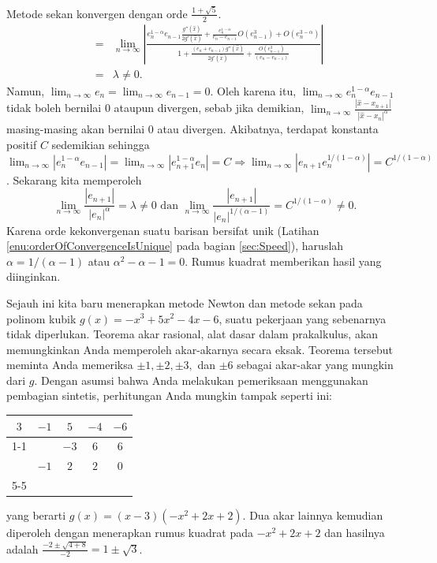 \begin{digression}{Metode sekan konvergen dengan orde $\frac{1+\sqrt{5}}{2}$.}
\begin{eqnarray*}
 & = & \lim_{n\to\infty}\left|\frac{e_{n}^{1-\alpha}e_{n-1}\frac{g''(\hat{x})}{2g'(\hat{x})}+\frac{e_{n}^{1-\alpha}}{e_{n}-e_{n-1}}O(e_{n-1}^{3})+O(e_{n}^{3-\alpha})}{1+\frac{(e_{n}+e_{n-1})g''(\hat{x})}{2g'(\hat{x})}+\frac{O(e_{n-1}^{3})}{(e_{n}-e_{n-1})}}\right|\\
 & = & \lambda\neq0.
\end{eqnarray*}
Namun, $\lim_{n\to\infty}e_{n}=\lim_{n\to\infty}e_{n-1}=0$. Oleh
karena itu, $\lim_{n\to\infty}e_{n}^{1-\alpha}e_{n-1}$ tidak boleh
bernilai 0 ataupun divergen, sebab jika demikian, $\lim_{n\to\infty}\frac{|\hat{x}-x_{n+1}|}{|\hat{x}-x_{n}|^{\alpha}}$
masing-masing akan bernilai 0 atau divergen. Akibatnya, terdapat konstanta
positif $C$ sedemikian sehingga $\lim_{n\to\infty}|e_{n}^{1-\alpha}e_{n-1}|=\lim_{n\to\infty}|e_{n+1}^{1-\alpha}e_{n}|=C\Rightarrow\lim_{n\to\infty}|e_{n+1}e_{n}^{1/(1-\alpha)}|=C^{1/(1-\alpha)}$.
Sekarang kita memperoleh 
\[
\lim_{n\to\infty}\frac{|e_{n+1}|}{|e_{n}|^{\alpha}}=\lambda\neq0\mbox{ dan }\lim_{n\to\infty}\frac{|e_{n+1}|}{|e_{n}|^{1/(\alpha-1)}}=C^{1/(1-\alpha)}\neq0.
\]
Karena orde kekonvergenan suatu barisan bersifat unik (Latihan \ref{enu:orderOfConvergenceIsUnique}
pada bagian \ref{sec:Speed}), haruslah $\alpha=1/(\alpha-1)$ atau
$\alpha^{2}-\alpha-1=0$. Rumus kuadrat memberikan hasil yang diinginkan.

\end{digression}

Sejauh ini kita baru menerapkan metode Newton dan metode sekan pada
polinom kubik $g(x)=-x^{3}+5x^{2}-4x-6$, suatu pekerjaan yang sebenarnya
tidak diperlukan. Teorema akar rasional, alat dasar dalam prakalkulus,
akan memungkinkan Anda memperoleh akar-akarnya secara eksak. Teorema
tersebut meminta Anda memeriksa $\pm1,\pm2,\pm3,$ dan $\pm6$ sebagai
akar-akar yang mungkin dari $g$. Dengan asumsi bahwa Anda melakukan
pemeriksaan menggunakan pembagian sintetis, perhitungan Anda mungkin
tampak seperti ini:\label{syntheticDivisionExample}

\begin{center}
\begin{tabular}{ccccc}
\multicolumn{1}{c|}{$3$} & $-1$ & $5$ & $-4$ & $-6$\tabularnewline
\cline{1-1}
 &  & $-3$ & $6$ & $6$\tabularnewline
\hline 
 & $-1$ & $2$ & \multicolumn{1}{c|}{$2$} & \multicolumn{1}{c|}{$0$}\tabularnewline
\cline{5-5}
\end{tabular}
\par\end{center}

\noindent yang berarti $g(x)=(x-3)(-x^{2}+2x+2)$. Dua akar lainnya
kemudian diperoleh dengan menerapkan rumus kuadrat pada $-x^{2}+2x+2$
dan hasilnya adalah $\frac{-2\pm\sqrt{4+8}}{-2}=1\pm\sqrt{3}$.

